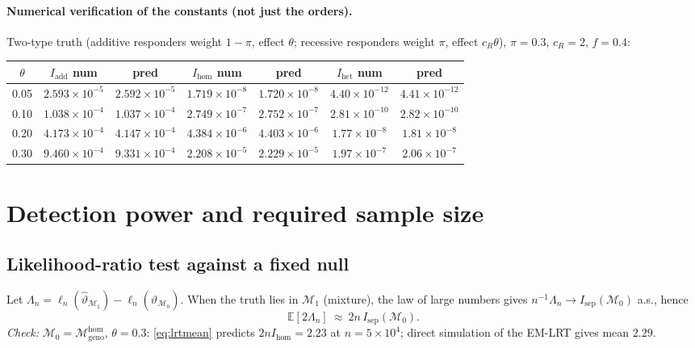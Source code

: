 \documentclass[11pt]{article}
\newcommand{\E}{\mathbb{E}}
\begin{document}
\paragraph{Numerical verification of the constants (not just the orders).}
Two-type truth (additive responders weight $1{-}\pi$, effect $\theta$; recessive
responders weight $\pi$, effect $c_R\theta$), $\pi=0.3$, $c_R=2$, $f=0.4$:
\begin{center}\small
\begin{tabular}{ccccccc}
\toprule
$\theta$ & $I_{\mathrm{add}}$ num & pred & $I_{\mathrm{hom}}$ num & pred & $I_{\mathrm{het}}$ num & pred\\
\midrule
0.05 & $2.593\!\times\!10^{-5}$ & $2.592\!\times\!10^{-5}$ & $1.719\!\times\!10^{-8}$ & $1.720\!\times\!10^{-8}$ & $4.40\!\times\!10^{-12}$ & $4.41\!\times\!10^{-12}$\\
0.10 & $1.038\!\times\!10^{-4}$ & $1.037\!\times\!10^{-4}$ & $2.749\!\times\!10^{-7}$ & $2.752\!\times\!10^{-7}$ & $2.81\!\times\!10^{-10}$ & $2.82\!\times\!10^{-10}$\\
0.20 & $4.173\!\times\!10^{-4}$ & $4.147\!\times\!10^{-4}$ & $4.384\!\times\!10^{-6}$ & $4.403\!\times\!10^{-6}$ & $1.77\!\times\!10^{-8}$ & $1.81\!\times\!10^{-8}$\\
0.30 & $9.460\!\times\!10^{-4}$ & $9.331\!\times\!10^{-4}$ & $2.208\!\times\!10^{-5}$ & $2.229\!\times\!10^{-5}$ & $1.97\!\times\!10^{-7}$ & $2.06\!\times\!10^{-7}$\\
\bottomrule
\end{tabular}
\end{center}

\section{Detection power and required sample size}
\subsection{Likelihood-ratio test against a fixed null}
Let $\Lambda_n=\ell_n(\hat\vartheta_{\mathcal M_1})-\ell_n(\hat\vartheta_{\mathcal M_0})$.
When the truth lies in $\mathcal M_1$ (mixture), the law of large numbers gives
$n^{-1}\Lambda_n\to I_{\mathrm{sep}}(\mathcal M_0)$ a.s., hence
\begin{equation}
\E[2\Lambda_n]\ \approx\ 2n\,I_{\mathrm{sep}}(\mathcal M_0).
\label{eq:lrtmean}
\end{equation}
\emph{Check:} $\mathcal M_0=\mathcal M_{\mathrm{geno}}^{\mathrm{hom}}$, $\theta=0.3$:
\eqref{eq:lrtmean} predicts $2n I_{\mathrm{hom}}=2.23$ at $n=5\times10^4$; direct
simulation of the EM-LRT gives mean $2.29$.
\end{document}
